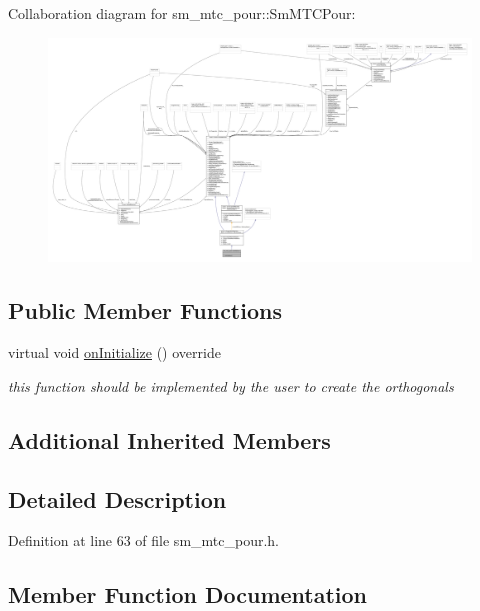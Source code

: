 Collaboration diagram for sm\+\_\+mtc\+\_\+pour\+:\+:Sm\+M\+T\+C\+Pour\+:
\nopagebreak
\begin{figure}[H]
\begin{center}
\leavevmode
\includegraphics[width=350pt]{structsm__mtc__pour_1_1SmMTCPour__coll__graph}
\end{center}
\end{figure}
\subsection*{Public Member Functions}
\begin{DoxyCompactItemize}
\item 
virtual void \hyperlink{structsm__mtc__pour_1_1SmMTCPour_ae19350523667551a652762634ad294ef}{on\+Initialize} () override
\begin{DoxyCompactList}\small\item\em this function should be implemented by the user to create the orthogonals \end{DoxyCompactList}\end{DoxyCompactItemize}
\subsection*{Additional Inherited Members}


\subsection{Detailed Description}


Definition at line 63 of file sm\+\_\+mtc\+\_\+pour.\+h.



\subsection{Member Function Documentation}
